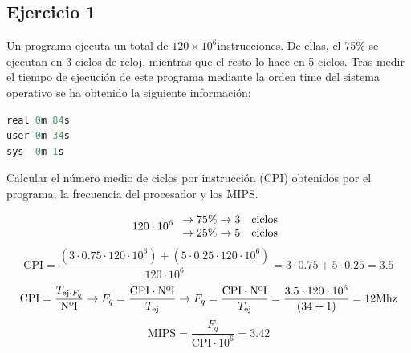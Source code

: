 \subsection{Ejercicio 1}
\noindent
Un programa ejecuta un total de $120\times 10^6$instrucciones. De ellas, el 75\% se ejecutan en 3 ciclos de reloj, mientras que el resto lo hace en 5 ciclos. Tras medir el tiempo de ejecución de este programa mediante la orden time del sistema operativo se ha obtenido la siguiente información:
\begin{lstlisting}[language=C]
real 0m 84s
user 0m 34s
sys  0m 1s
\end{lstlisting} 
Calcular el número medio de ciclos por instrucción (CPI) obtenidos por el programa, la frecuencia del procesador y los MIPS.
\begin{tcolorbox}[colback=white,colframe=cyan!50!black,fonttitle=\bfseries]
\[120\cdot 10^6\left.\begin{array}{ll}
\rightarrow 75\%\rightarrow 3\quad\text{ciclos}\\
\rightarrow 25\%\rightarrow 5\quad\text{ciclos}
\end{array}\right.
\]
\[
\text{CPI}=\dfrac{(3\cdot0.75\cdot 120\cdot 10^6)+(5\cdot 0.25\cdot 120\cdot 10^6)}{120\cdot 10^6}=3\cdot 0.75+5\cdot 0.25=3.5
\]
\[
\text{CPI}=\dfrac{T_{\text{ej}\cdot F_q}}{\text{NºI}}\rightarrow F_q=\dfrac{\text{CPI}\cdot\text{NºI}}{T_{\text{ej}}}\rightarrow F_q=\dfrac{\text{CPI}\cdot\text{NºI}}{T_{\text{ej}}}=\dfrac{3.5\cdot 120\cdot 10^6}{(34+1)}=12\text{Mhz}
\]
\[
\text{MIPS}=\dfrac{F_q}{\text{CPI}\cdot 10^6}=3.42
\]
\end{tcolorbox}
